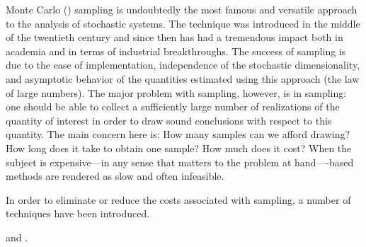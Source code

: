 Monte Carlo () sampling \cite{xiu2010} is undoubtedly the most famous
and versatile approach to the analysis of stochastic systems. The technique was
introduced in the middle of the twentieth century and since then has had a
tremendous impact both in academia and in terms of industrial breakthroughs. The
success of  sampling is due to the ease of implementation, independence
of the stochastic dimensionality, and asymptotic behavior of the quantities
estimated using this approach (the law of large numbers). The major problem with
 sampling, however, is in sampling: one should be able to collect a
sufficiently large number of realizations of the quantity of interest in order
to draw sound conclusions with respect to this quantity. The main concern here
is: How many samples can we afford drawing? How long does it take to obtain one
sample? How much does it cost? When the subject is expensive---in any sense that
matters to the problem at hand----based methods are rendered as slow
and often infeasible.

In order to eliminate or reduce the costs associated with  sampling, a
number of techniques have been introduced.

\cite{ukhov2014} and \cite{ukhov2015}.
